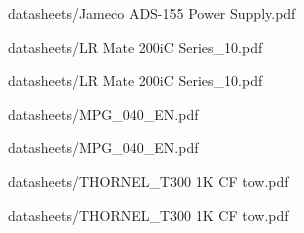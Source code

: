 
            {datasheets/Jameco ADS-155 Power Supply.pdf}


            {datasheets/LR Mate 200iC Series_10.pdf}


            {datasheets/LR Mate 200iC Series_10.pdf}


            {datasheets/MPG_040_EN.pdf}


            {datasheets/MPG_040_EN.pdf}


            {datasheets/THORNEL_T300 1K CF tow.pdf}


            {datasheets/THORNEL_T300 1K CF tow.pdf}
